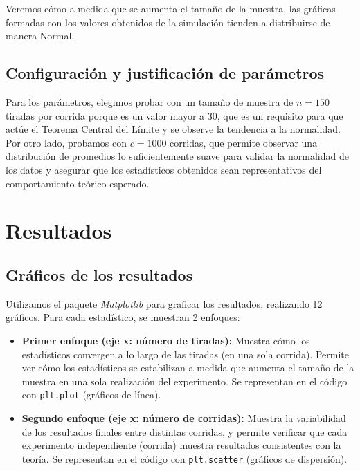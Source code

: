 \documentclass{article}
\begin{document}
Veremos cómo a medida que se aumenta el tamaño de la muestra, las gráficas formadas con los valores obtenidos de la 
simulación tienden a distribuirse de manera Normal.

\subsection{Configuración y justificación de parámetros}
Para los parámetros, elegimos probar con un tamaño de muestra de $n=150$ tiradas por corrida porque es un valor mayor a 30, que es un requisito para que actúe el Teorema Central del Límite y se observe la tendencia a la normalidad. Por otro lado, probamos con $c=1000$ corridas, que permite observar una distribución de promedios lo suficientemente suave para validar la normalidad de los datos y asegurar que los estadísticos obtenidos sean representativos del comportamiento teórico esperado.

\section{Resultados}
\label{sec:resultados}

\subsection{Gráficos de los resultados}

Utilizamos el paquete \textit{Matplotlib} para graficar los resultados, realizando 12 gráficos. Para cada estadístico, 
se muestran 2 enfoques:

\begin{itemize}
  \item \textbf{Primer enfoque (eje x: número de tiradas):} Muestra cómo los estadísticos convergen a lo largo de las tiradas 
  (en una sola corrida). Permite ver cómo los estadísticos se estabilizan a medida que aumenta el tamaño de la muestra en una 
  sola realización del experimento. Se representan en el código con \verb+plt.plot+ (gráficos de línea).
  
  \item \textbf{Segundo enfoque (eje x: número de corridas):} Muestra la variabilidad de los resultados finales entre distintas 
  corridas, y permite verificar que cada experimento independiente (corrida) muestra resultados consistentes con la teoría. 
  Se representan en el código con \verb+plt.scatter+ (gráficos de dispersión).
\end{itemize}
\end{document}
